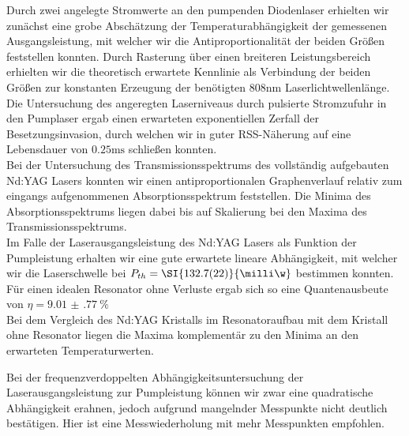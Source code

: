\documentclass[../main.tex]{subfiles}
\begin{document}
    Durch zwei angelegte Stromwerte an den pumpenden Diodenlaser erhielten wir zunächst eine grobe Abschätzung der Temperaturabhängigkeit der gemessenen Ausgangsleistung, mit welcher wir die Antiproportionalität der beiden Größen feststellen konnten. Durch Rasterung über einen breiteren Leistungsbereich erhielten wir die theoretisch erwartete Kennlinie als Verbindung der beiden Größen zur konstanten Erzeugung der benötigten $808\si{\nm}$ Laserlichtwellenlänge. \\

    Die Untersuchung des angeregten Laserniveaus durch pulsierte Stromzufuhr in den Pumplaser ergab einen erwarteten exponentiellen Zerfall der Besetzungsinvasion, durch welchen wir in guter RSS-Näherung auf eine Lebensdauer von $0.25\si{\ms}$ schließen konnten. \\

    Bei der Untersuchung des Transmissionsspektrums des vollständig aufgebauten Nd:YAG Lasers konnten wir einen antiproportionalen Graphenverlauf relativ zum eingangs aufgenommenen Absorptionsspektrum feststellen. Die Minima des Absorptionsspektrums liegen dabei bis auf Skalierung bei den Maxima des Transmissionsspektrums. \\

    Im Falle der Laserausgangsleistung des Nd:YAG Lasers als Funktion der Pumpleistung erhalten wir eine gute erwartete lineare Abhängigkeit, mit welcher wir die Laserschwelle bei $P_{th} = \SI{132.7(22)}{\milli\w}$ bestimmen konnten. Für einen idealen Resonator ohne Verluste ergab sich so eine Quantenausbeute von  $\eta = \SI{9.01(77)}{\percent}$\\

    Bei dem Vergleich des Nd:YAG Kristalls im Resonatoraufbau mit dem Kristall ohne Resonator liegen die Maxima komplementär zu den Minima an den erwarteten Temperaturwerten. 

    Bei der frequenzverdoppelten Abhängigkeitsuntersuchung der Laserausgangsleistung zur Pumpleistung können wir zwar eine quadratische Abhängigkeit erahnen, jedoch aufgrund mangelnder Messpunkte nicht deutlich bestätigen. Hier ist eine Messwiederholung mit mehr Messpunkten empfohlen. 
\end{document}
